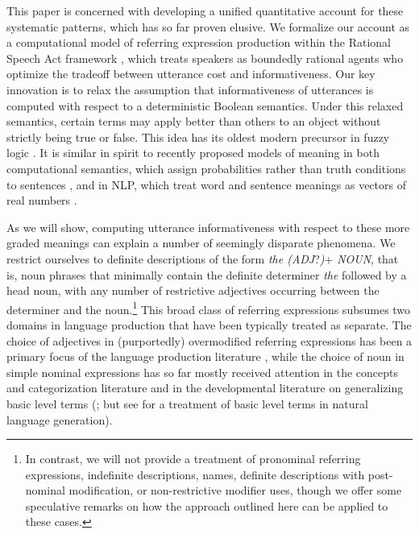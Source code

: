 \documentclass[11pt]{article}
\newcommand{\cg}[1]{\textcolor{Purple}{[cg: #1]}}
\begin{document}
This paper is concerned with developing a unified quantitative account for these systematic patterns, which has so far proven elusive.
We formalize our account as a computational model of referring expression production within the Rational Speech Act framework \cite{frank2012, goodman2016, FrankeJaeger2016}, which treats speakers as boundedly rational agents who optimize the tradeoff between utterance cost and informativeness. Our key innovation is to relax the assumption that informativeness of utterances is computed with respect to a deterministic Boolean semantics. Under this relaxed semantics, certain terms may apply better than others to an object without strictly being true or false. This idea has its oldest modern precursor in fuzzy logic \cite{zadeh1965fuzzy}. It is similar in spirit  to recently proposed models of meaning in both computational semantics, which assign probabilities rather than truth conditions to sentences \cite{Bernardy2018}, and in NLP, which treat word and sentence meanings  as vectors of real numbers \cite{pennington2014glove, peters2018deep, devlin2018bert}. 

As we will show,  computing utterance informativeness with respect to these more graded meanings can explain a number of seemingly disparate phenomena. %
We restrict ourselves to definite descriptions of the form \emph{the (ADJ}?\emph{)}+ \emph{NOUN}, that is, noun phrases that minimally contain the definite determiner \emph{the} followed by a head noun, with any number of restrictive adjectives occurring between the determiner and the noun.\footnote{In contrast, we will not provide a treatment of pronominal referring expressions, indefinite descriptions, names, definite descriptions with post-nominal modification, or non-restrictive modifier uses, though we offer some speculative remarks on how the approach outlined here can be applied to these cases.} 
This broad class of referring expressions subsumes two domains in language production that have been typically treated as separate. %
The choice of adjectives in (purportedly) overmodified referring expressions has been a primary focus of the language production literature
\cite{herrmann1976, Pechmann1989, nadig2002, sedivy2003a, Maes2004, Engelhardt2006, Arts2011, Koolen2011, rubiofernandez2016}, while the choice of noun in simple nominal expressions has so far mostly received attention in the concepts and categorization literature \cite{Rosch1973, Rosch1976} and in the developmental literature on generalizing basic level terms (; but see  for a treatment of basic level terms in natural language generation). 
\end{document}
